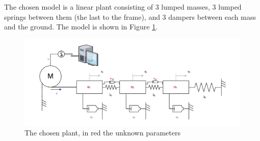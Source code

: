 \documentclass[twosided,a4paper]{article}           %
\begin{document}
The chosen model is a linear plant consisting of 3 lumped masses, 3 lumped springs between them (the last to the frame), and 3 dampers between each mass and the ground. The model is shown in Figure \ref{fig:theplant1}.
\begin{figure}[H]
	\centering
	\includegraphics[width=\linewidth]{img/theplant1}
	\caption[The linear plant]{The chosen plant, in red the unknown parameters}
	\label{fig:theplant1}
\end{figure} %
\end{document}
